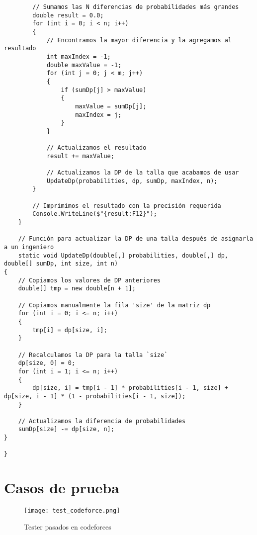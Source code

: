 \documentclass{article}
\begin{document}
\begin{verbatim}
        // Sumamos las N diferencias de probabilidades más grandes
        double result = 0.0;
        for (int i = 0; i < n; i++)
        {
            // Encontramos la mayor diferencia y la agregamos al resultado
            int maxIndex = -1;
            double maxValue = -1;
            for (int j = 0; j < m; j++)
            {
                if (sumDp[j] > maxValue)
                {
                    maxValue = sumDp[j];
                    maxIndex = j;
                }
            }

            // Actualizamos el resultado
            result += maxValue;

            // Actualizamos la DP de la talla que acabamos de usar
            UpdateDp(probabilities, dp, sumDp, maxIndex, n);
        }

        // Imprimimos el resultado con la precisión requerida
        Console.WriteLine($"{result:F12}");
    }

    // Función para actualizar la DP de una talla después de asignarla a un ingeniero
    static void UpdateDp(double[,] probabilities, double[,] dp, double[] sumDp, int size, int n)
{
    // Copiamos los valores de DP anteriores
    double[] tmp = new double[n + 1];
    
    // Copiamos manualmente la fila 'size' de la matriz dp
    for (int i = 0; i <= n; i++)
    {
        tmp[i] = dp[size, i];
    }

    // Recalculamos la DP para la talla `size`
    dp[size, 0] = 0;
    for (int i = 1; i <= n; i++)
    {
        dp[size, i] = tmp[i - 1] * probabilities[i - 1, size] + dp[size, i - 1] * (1 - probabilities[i - 1, size]);
    }

    // Actualizamos la diferencia de probabilidades
    sumDp[size] -= dp[size, n];
}

}

\end{verbatim}
\section{Casos de prueba}

\begin{figure}[H] 
    \centering 
    \texttt{[image: test\_codeforce.png]} 
    \caption{Tester pasados en codeforces}
\end{figure}
\end{document}
